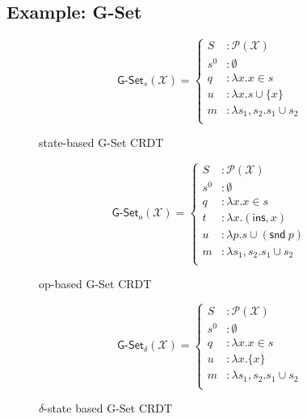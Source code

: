 \subsection{Example: G-Set}
\label{sec:example-gset}


\begin{figure}[H]
  \centering
  \[
    \textsf{G-Set}_s(\mathcal{X}) = \left\{\begin{aligned}
      S &: \mathcal{P}(\mathcal{X}) \\
      s^0 &: \emptyset \\
      q &: \lambda x. x \in s \\
      u &: \lambda x. s \cup \{ x \} \\
      m &: \lambda s_1, s_2. s_1 \cup s_2 \\
    \end{aligned}\right.
  \]
  \caption{state-based \textsf{G-Set} CRDT}
\end{figure}

\begin{figure}[H]
  \centering
  \[
    \textsf{G-Set}_o(\mathcal{X}) = \left\{\begin{aligned}
      S &: \mathcal{P}(\mathcal{X}) \\
      s^0 &: \emptyset \\
      q &: \lambda x. x \in s \\
      t &: \lambda x. (\textsf{ins}, x) \\
      u &: \lambda p. s \cup (\textsf{snd}~p) \\
      m &: \lambda s_1, s_2. s_1 \cup s_2 \\
    \end{aligned}\right.
  \]
  \caption{op-based \textsf{G-Set} CRDT}
\end{figure}

\begin{figure}[H]
  \centering
  \[
    \textsf{G-Set}_\delta(\mathcal{X}) = \left\{\begin{aligned}
      S &: \mathcal{P}(\mathcal{X}) \\
      s^0 &: \emptyset \\
      q &: \lambda x. x \in s \\
      u &: \lambda x. \{ x \} \\
      m &: \lambda s_1, s_2. s_1 \cup s_2 \\
    \end{aligned}\right.
  \]
  \caption{$\delta$-state based \textsf{G-Set} CRDT}
\end{figure}

